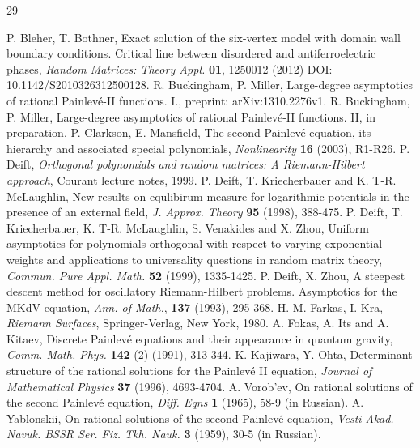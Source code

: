 \documentclass[10pt,oneside,reqno]{amsart}
\numberwithin{equation}{section}
\begin{document}
\begin{thebibliography}{29}

 P. Bleher, T. Bothner, Exact solution of the six-vertex model with domain wall boundary conditions. Critical line between disordered 
  and antiferroelectric phases, {\it Random Matrices: Theory Appl.} {\bf 01}, 1250012 (2012) DOI: 10.1142/S2010326312500128.
 R. Buckingham, P. Miller, Large-degree asymptotics of rational Painlev\'e-II functions. I., preprint: arXiv:1310.2276v1.
 R. Buckingham, P. Miller, Large-degree asymptotics of rational Painlev\'e-II functions. II, in preparation.
 P. Clarkson, E. Mansfield, The second Painlev\'e equation, its hierarchy and associated special polynomials, {\it Nonlinearity} {\bf 16} (2003), R1-R26.
 P. Deift, {\it Orthogonal polynomials and random matrices: A Riemann-Hilbert approach}, Courant lecture notes, 1999.
 P. Deift, T. Kriecherbauer and K. T-R. McLaughlin, New results on equlibirum measure for logarithmic potentials in the presence of an external field,
 {\it J. Approx. Theory} {\bf 95} (1998), 388-475.
 P. Deift, T. Kriecherbauer, K. T-R. McLaughlin, S. Venakides and X. Zhou, Uniform asymptotics for polynomials orthogonal with respect to varying 
exponential weights and applications to universality questions in random matrix theory, {\it Commun. Pure Appl. Math.} {\bf 52} (1999), 1335-1425.
 P. Deift, X. Zhou, A steepest descent method for oscillatory Riemann-Hilbert problems. Asymptotics for the MKdV equation, {\it Ann. of Math.}, {\bf 137} (1993), 295-368.
 H. M. Farkas, I. Kra, {\it Riemann Surfaces}, Springer-Verlag, New York, 1980.
 A. Fokas, A. Its and A. Kitaev, Discrete Painlev\'e equations and their appearance in quantum gravity, {\it Comm. Math. Phys.} {\bf 142} (2) (1991), 313-344.
 K. Kajiwara, Y. Ohta, Determinant structure of the rational solutions for the Painlev\'e II equation, {\it Journal of Mathematical Physics} {\bf 37} 
	      (1996), 4693-4704.
 A. Vorob'ev, On rational solutions of the second Painlev\'e equation, {\it Diff. Eqns} {\bf 1} (1965), 58-9 (in Russian).
 A. Yablonskii, On rational solutions of the second Painlev\'e equation, {\it Vesti Akad. Navuk. BSSR Ser. Fiz. Tkh. Nauk.} {\bf 3} (1959), 30-5 (in Russian).
\end{thebibliography}



%
%
%
%
\end{document}

